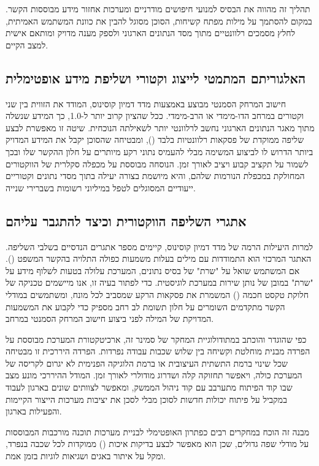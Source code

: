 \documentclass{hebrew-academic-template}
\begin{document}
תהליך זה מהווה את הבסיס למנועי חיפושים מודרניים ומערכות אחזור מידע מבוססות הקשר. במקום להסתמך על מילות מפתח קשיחות, הסוכן מסוגל להבין את כוונת המשתמש האמיתית, לחלץ מסמכים רלוונטיים מתוך מסד הנתונים הארגוני ולספק מענה מדויק ומותאם אישית למצב הקיים.

\subsection{האלגוריתם המתמטי לייצוג וקטורי ושליפת מידע אופטימלית}
חישוב המרחק הסמנטי מבוצע באמצעות מדד דמיון קוסינוס, המודד את הזווית בין שני וקטורים במרחב הדו-מימדי או הרב-מימדי. ככל שהציון קרוב יותר ל-1.0, כך המידע שנשלה מתוך מאגר הנתונים הארגוני נחשב לרלוונטי יותר לשאילתה הנוכחית. שיטה זו מאפשרת לבצע שליפה ממוקדת של פסקאות רלוונטיות בלבד (), ומבטיחה שהסוכן יקבל את המידע המדויק ביותר הדרוש לו לביצוע המשימה מבלי להעמיס נתוני רקע מיותרים על חלון ההקשר שלו ובכך לשמור על תקציב קבוע ויציב לאורך זמן. הנוסחה מבוססת על מכפלה סקלרית של הווקטורים המחולקת במכפלת הנורמות שלהם, והיא מיושמת בצורה יעילה בתוך מסדי נתונים וקטוריים ייעודיים המסוגלים לטפל במיליוני רשומות בשברירי שנייה.

\subsection{אתגרי השליפה הווקטורית וכיצד להתגבר עליהם}
למרות היעילות הרמה של מדד דמיון קוסינוס, קיימים מספר אתגרים הנדסיים בשלבי השליפה. האתגר המרכזי הוא התמודדות עם מילים בעלות משמעות כפולה התלויה בהקשר המשפט (). אם המשתמש שואל על "שרת" של בסיס נתונים, המערכת עלולה בטעות לשלוף מידע על "שרת" במובן של נותן שירות במערכת לוגיסטית. כדי לפתור בעיה זו, אנו מיישמים טכניקה של חלוקת טקסט חכמה () המשמרת את פסקאות הרקע שמסביב לכל מונח, ומשתמשים במודלי הקשר מתקדמים השומרים על חלון תשומת לב רחב מספיק כדי לקבוע את המשמעות המדויקת של המילה לפני ביצוע חישוב המרחק הסמנטי במרחב.

כפי שהוגדר והוכתב במתודולוגיית המחקר של סמינר זה, ארכיטקטורת המערכת מבוססת על הפרדה מבנית מוחלטת וקשיחה בין שלוש שכבות עבודה נפרדות. הפרדה היררכית זו מבטיחה שכל שינוי ברמת התשתית העיצובית או ברמת הלוגיקה הפנימית לא יגרום לקריסה של המערכת כולה, ויאפשר תחזוקה קלה ושדרוג מודולרי לאורך זמן. המודל ההיררכי מונע מצב שבו קוד הפיתוח מתערבב עם קוד ניהול הממשק, ומאפשר לצוותים שונים בארגון לעבוד במקביל על פיתוח יכולות חדשות לסוכן מבלי לסכן את יציבות מערכות הייצור הקיימות והפעילות בארגון.

מבנה זה הוכח במחקרים רבים כפתרון האופטימלי לבניית מערכות תוכנה מורכבות המבוססות על מודלי שפה גדולים, שכן הוא מאפשר לבצע בדיקות איכות () ממוקדות לכל שכבה בנפרד, ומקל על איתור באגים ושגיאות לוגיות בזמן אמת.
\end{document}

